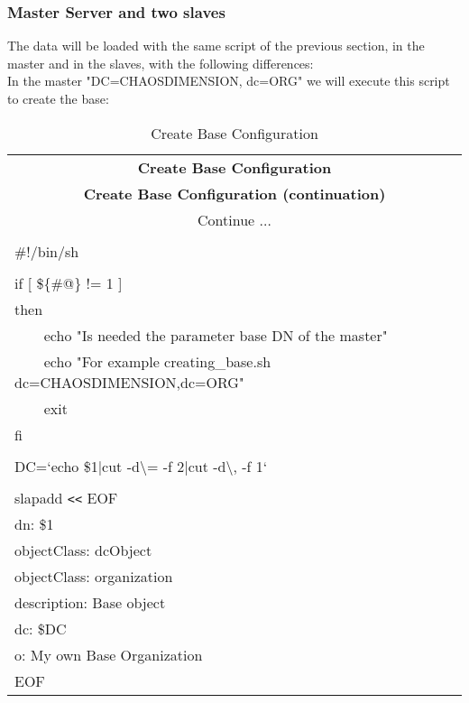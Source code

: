 \subsubsection{Master Server and two slaves}

The data will be loaded with the same script of the previous section, in the master and in the slaves, with the following differences:\\

In the master "DC=CHAOSDIMENSION, dc=ORG" we will execute this script  to create the base: \\

\begin{center}
\begin{longtable}{|l|}\hline
\caption{Create Base Configuration}\\
\hline \hline
\multicolumn{1}{|c|}{\textbf{Create Base Configuration}}\\
\hline \hline
\endfirsthead
\hline \hline
\multicolumn{1}{|c|}{\textbf{Create Base Configuration (continuation)}}\\
\hline \hline
\endhead
\hline
\multicolumn{1}{|c|}{Continue $\ldots$}\\
\hline
\endfoot
\hline
\multicolumn{1}{|c|}{\textbf{End}}\\
\hline
\endlastfoot
\#!/bin/sh\\
\\
if [ \$\{\#@\} != 1 ]\\
then\\
\verb|    |echo "Is needed the parameter base DN of the master"\\
\verb|    |echo "For example creating\_base.sh dc=CHAOSDIMENSION,dc=ORG"\\
\verb|    |exit\\
fi\\
\\
DC=`echo \$1|cut -d\textbackslash= -f 2|cut -d\textbackslash, -f 1`\\
\\
slapadd \verb|<<|  EOF\\
dn: \$1\\
objectClass: dcObject\\
objectClass: organization\\
description: Base object\\
dc: \$DC\\
o: My own Base Organization\\
EOF\\
\end{longtable}
\end{center}


